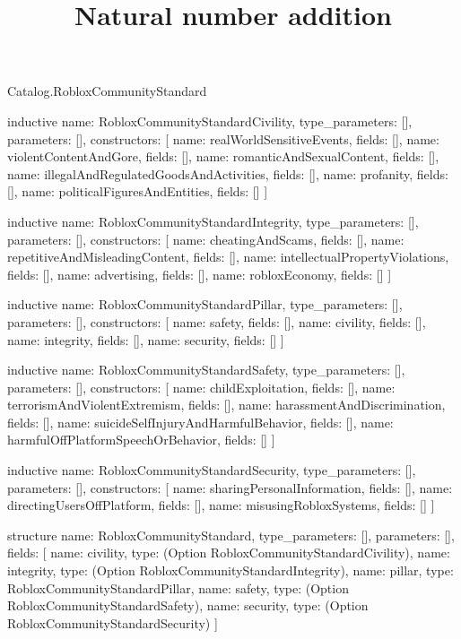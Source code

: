 \begin{lexlean}{Catalog.RobloxCommunityStandard}
\title{Natural number addition}
\begin{semanticmodule}
inductive{
  name: RobloxCommunityStandardCivility,
  type_parameters: [],
  parameters: [],
  constructors: [
    {name: realWorldSensitiveEvents, fields: []},
    {name: violentContentAndGore, fields: []},
    {name: romanticAndSexualContent, fields: []},
    {name: illegalAndRegulatedGoodsAndActivities, fields: []},
    {name: profanity, fields: []},
    {name: politicalFiguresAndEntities, fields: []}
  ]
}

inductive{
  name: RobloxCommunityStandardIntegrity,
  type_parameters: [],
  parameters: [],
  constructors: [
    {name: cheatingAndScams, fields: []},
    {name: repetitiveAndMisleadingContent, fields: []},
    {name: intellectualPropertyViolations, fields: []},
    {name: advertising, fields: []},
    {name: robloxEconomy, fields: []}
  ]
}

inductive{
  name: RobloxCommunityStandardPillar,
  type_parameters: [],
  parameters: [],
  constructors: [
    {name: safety, fields: []},
    {name: civility, fields: []},
    {name: integrity, fields: []},
    {name: security, fields: []}
  ]
}

inductive{
  name: RobloxCommunityStandardSafety,
  type_parameters: [],
  parameters: [],
  constructors: [
    {name: childExploitation, fields: []},
    {name: terrorismAndViolentExtremism, fields: []},
    {name: harassmentAndDiscrimination, fields: []},
    {name: suicideSelfInjuryAndHarmfulBehavior, fields: []},
    {name: harmfulOffPlatformSpeechOrBehavior, fields: []}
  ]
}

inductive{
  name: RobloxCommunityStandardSecurity,
  type_parameters: [],
  parameters: [],
  constructors: [
    {name: sharingPersonalInformation, fields: []},
    {name: directingUsersOffPlatform, fields: []},
    {name: misusingRobloxSystems, fields: []}
  ]
}

structure{
  name: RobloxCommunityStandard,
  type_parameters: [],
  parameters: [],
  fields: [
    {name: civility, type: (Option RobloxCommunityStandardCivility)},
    {name: integrity, type: (Option RobloxCommunityStandardIntegrity)},
    {name: pillar, type: RobloxCommunityStandardPillar},
    {name: safety, type: (Option RobloxCommunityStandardSafety)},
    {name: security, type: (Option RobloxCommunityStandardSecurity)}
  ]
}
\end{semanticmodule}
\end{lexlean}
